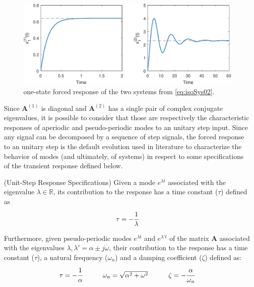 \documentclass[a4paper,11pt]{book}
\numberwithin{figure}{chapter}
\numberwithin{equation}{chapter}
\numberwithin{table}{chapter}
\theoremstyle{definition}
\newtheorem{definition}{Definition}[chapter]
\newcounter{boxed-theorem}
\newcounter{boxed-definition}
\newenvironment{boxed-definition}[1]
{\begin{shaded} \begin{definition}{#1}}
{\end{definition} \end{shaded}}
\begin{document}
\begin{figure}[ht]
	\centering
	\includegraphics[width=\textwidth]{chapter2/forcedResponse}
	\caption{one-state forced response of the two systems from \eqref{eq:isoSys02}.}
	\label{fig:forcedResponse}
\end{figure}

Since $\bm{A}^{(1)}$ is diagonal and $\bm{A}^{(2)}$ has a single pair of complex conjugate eigenvalues, it is possible to consider that those are respectively the characteristic responses of aperiodic and pseudo-periodic modes to an unitary step input. Since any signal can be decomposed by a sequence of step signals, the forced response to an unitary step is the default evolution used in literature to characterize the behavior of modes (and ultimately, of systems) in respect to some specifications of the transient response defined below.

\begin{boxed-definition}{(Unit-Step Response Specifications)} \label{def:responseParameters}
	Given a mode $e^{\lambda t}$ associated with the eigenvalue $\lambda \in \mathbb{R}$, its contribution to the response has a time constant ($\tau$) defined as
	\begin{equation}
		\tau = - \cfrac{1}{\lambda}
	\end{equation}	
	
	Furthermore, given pseudo-periodic modes $e^{\lambda t}$ and $e^{\lambda' t}$ of the matrix $\bm{A}$ associated with the eigenvalues $\lambda,\lambda' = \alpha \pm j \omega$, their contribution to the response has a time constant ($\tau$), a natural frequency ($\omega_n$) and a damping coefficient ($\zeta$) defined as:
	\begin{equation}
	\begin{matrix}
		\tau = - \cfrac{1}{\alpha} & & & \omega_n = \sqrt{\alpha^2 + \omega^2} & & & \zeta = - \cfrac{\alpha}{\omega_n}
	\end{matrix}
	\end{equation}
	
\end{boxed-definition}   
\end{document}
